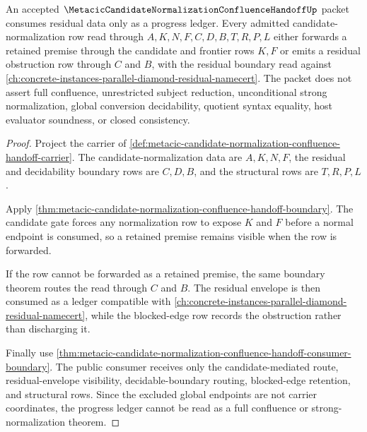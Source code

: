 \begin{theorem}
\label{thm:metacic-candidate-normalization-residual-progress}
An accepted $\MetacicCandidateNormalizationConfluenceHandoffUp$ packet consumes residual data only as a progress ledger. Every admitted candidate-normalization row read through $A,K,N,F,C,D,B,T,R,P,L$ either forwards a retained premise through the candidate and frontier rows $K,F$ or emits a residual obstruction row through $C$ and $B$, with the residual boundary read against \autoref{ch:concrete-instances-parallel-diamond-residual-namecert}. The packet does not assert full confluence, unrestricted subject reduction, unconditional strong normalization, global conversion decidability, quotient syntax equality, host evaluator soundness, or closed consistency.
\end{theorem}
\begin{proof}
Project the carrier of \autoref{def:metacic-candidate-normalization-confluence-handoff-carrier}. The candidate-normalization data are $A,K,N,F$, the residual and decidability boundary rows are $C,D,B$, and the structural rows are $T,R,P,L$.

Apply \autoref{thm:metacic-candidate-normalization-confluence-handoff-boundary}. The candidate gate forces any normalization row to expose $K$ and $F$ before a normal endpoint is consumed, so a retained premise remains visible when the row is forwarded.

If the row cannot be forwarded as a retained premise, the same boundary theorem routes the read through $C$ and $B$. The residual envelope is then consumed as a ledger compatible with \autoref{ch:concrete-instances-parallel-diamond-residual-namecert}, while the blocked-edge row records the obstruction rather than discharging it.

Finally use \autoref{thm:metacic-candidate-normalization-confluence-handoff-consumer-boundary}. The public consumer receives only the candidate-mediated route, residual-envelope visibility, decidable-boundary routing, blocked-edge retention, and structural rows. Since the excluded global endpoints are not carrier coordinates, the progress ledger cannot be read as a full confluence or strong-normalization theorem.
\end{proof}

